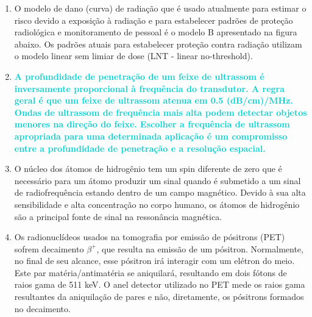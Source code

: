 \documentclass[11pt,a4paper]{article}
\begin{document}
\begin{enumerate}
        \item O modelo de dano (curva) de radiação que é usado atualmente para estimar o risco devido a exposição à radiação e para estabelecer padrões de proteção radiológica e monitoramento de pessoal é o modelo B apresentado na figura abaixo. Os padrões atuais para estabelecer proteção contra radiação utilizam o modelo linear sem limiar de dose (LNT - linear no-threshold).
        
        \begin{center}
        \end{center}

        \item \textcolor{DarkTurquoise}{\textbf{A profundidade de penetração de um feixe de ultrassom é inversamente proporcional à frequência do transdutor. A regra geral é que um feixe de ultrassom atenua em 0.5 (dB/cm)/MHz. Ondas de ultrassom de frequência mais alta podem detectar objetos menores na direção do feixe. Escolher a frequência de ultrassom apropriada para uma determinada aplicação é um compromisso entre a profundidade de penetração e a resolução espacial.}}

        \item O núcleo dos átomos de hidrogênio tem um spin diferente de zero que é necessário para um átomo produzir um sinal quando é submetido a um sinal de radiofrequência estando dentro de um campo magnético. Devido à sua alta sensibilidade e alta concentração no corpo humano, os átomos de hidrogênio são a principal fonte de sinal na ressonância magnética.

        \item Os radionuclídeos usados na tomografia por emissão de pósitrons (PET) sofrem decaimento $\beta^+$, que resulta na emissão de um pósitron. Normalmente, no final de seu alcance, esse pósitron irá interagir com um elétron do meio. Este par matéria/antimatéria se aniquilará, resultando em dois fótons de raios gama de 511 keV. O anel detector utilizado no PET mede os raios gama resultantes da aniquilação de pares e não, diretamente, os pósitrons formados no decaimento.


\end{enumerate}
\end{document}
